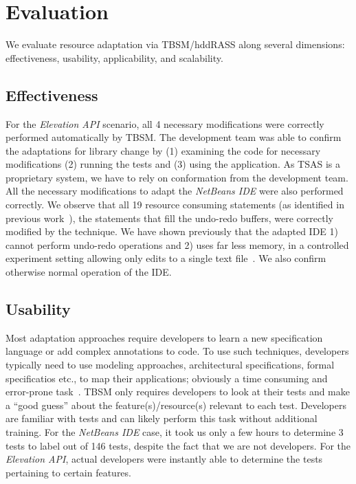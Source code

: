 \section{Evaluation}
We evaluate resource adaptation via TBSM/hddRASS along several dimensions: effectiveness, usability, applicability, and scalability.

\subsection{Effectiveness}
For the \textit{Elevation API} scenario, all 4 necessary modifications were correctly performed automatically by TBSM. The development team was able to confirm the adaptations for library change by (1) examining the code for necessary modifications (2) running the tests and (3) using the application. As TSAS is a proprietary system, we have to rely on conformation from the development team. All the necessary modifications to adapt the \textit{NetBeans IDE} were also performed correctly. We observe that all 19 resource consuming statements (as identified in previous work~\cite{christi2018qrs}), the statements that fill the undo-redo buffers, were correctly modified by the technique. We have shown previously that the adapted IDE 1) cannot perform undo-redo operations and 2) uses far less memory, in a controlled experiment setting allowing only edits to a single text file~\cite{christi2017saso}. We also confirm otherwise normal operation of the IDE.

\subsection{Usability}
Most adaptation approaches require developers to learn a new specification language or add complex annotations to code. To use such techniques, developers typically need to use modeling approaches, architectural specifications, formal specificatios etc., to map their applications; obviously a time consuming and error-prone task~\cite{salehie2009selfadaptive, krupitzer2015a}. TBSM only requires developers to look at their tests and make a ``good guess'' about the feature(s)/resource(s) relevant to each test. Developers are familiar with tests and can likely perform this task without additional training. For the \textit{NetBeans IDE} case, it took us only a few hours to determine 3 tests to label out of 146 tests, despite the fact that we are not developers. For the \textit{Elevation API}, actual developers were instantly able to determine the tests pertaining to certain features.

